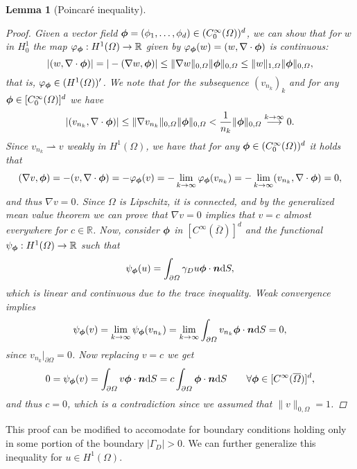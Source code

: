 \documentclass{article}
\renewcommand{\vec}{\vectorsym}
\newcommand{\R}{\mathbb{R}}
\newtheorem{lemma}{Lemma}
\begin{document}
\begin{lemma}[Poincaré inequality]
\begin{proof}
        Given a vector field $\vec\phi = (\phi_1,\dots,\phi_d)\in (C_0^\infty(\Omega))^d$, we can show that for $w$ in $H_0^1$ the map $\varphi_{\vec{\phi}}:H^1(\Omega)\to\R$ given by $\varphi_{\vec{\phi}}(w) = (w, \nabla\cdot \vec \phi)$ is continuous:
        $$|(w,\nabla\cdot\vec\phi)| = |-(\nabla w, \vec\phi)| \leq \|\nabla w\|_{0,\Omega}\|\vec\phi\|_{0,\Omega} \leq \|w\|_{1,\Omega}\|\vec\phi\|_{0,\Omega},$$
        that is, $\varphi_{\vec{\phi}} \in (H^1(\Omega))'$. We note that for the subsequence $(v_{n_k})_k$ and for any $\vec\phi \in [C_0^\infty(\Omega)]^d$ we have 
        $$|(v_{n_k},\nabla\cdot\vec\phi)| \leq \|\nabla v_{n_k}\|_{0,\Omega}\|\vec\phi\|_{0,\Omega} < \frac{1}{n_k}\|\vec\phi\|_{0,\Omega}\overset{k\to\infty}{\longrightarrow} 0. $$
        Since $v_{n_k} \rightharpoonup v$ weakly in $H^1(\Omega)$, we have that for any $\vec\phi \in (C_0^\infty(\Omega))^d$ it holds that
        \begin{align*}
            (\nabla v,\vec\phi) = -(v,\nabla\cdot\vec\phi) = -\varphi_{\vec{\phi}}(v) = -\lim_{k\to\infty} \varphi_{\vec{\phi}}(v_{n_k}) = -\lim_{k\to\infty} (v_{n_k},\nabla\cdot\vec\phi) = 0,
        \end{align*}
        and thus $\nabla v = 0$. Since $\Omega$ is Lipschitz, it is connected, and by the generalized mean value theorem we can prove that $\nabla v = 0$ implies that $v=c$ almost everywhere for $c\in \mathbb{R}$. Now, consider $\vec\phi$ in $[C^\infty(\overline{\Omega})]^d$ and the functional $\psi_{\vec{\phi}}:H^1(\Omega)\to \mathbb{R}$ such that 
        $$\psi_{\vec{\phi}}(u) = \int_{\partial\Omega} \gamma_D u \vec\phi\cdot\vec n \mathrm{d}S,$$
        which is linear and continuous due to the trace inequality. Weak convergence implies
        $$\psi_{\vec{\phi}}(v) = \lim_{k\to\infty} \psi_{\vec{\phi}}(v_{n_k}) = \lim_{k\to\infty} \int_{\partial\Omega} v_{n_k} \vec\phi\cdot\vec n \mathrm{d}S = 0,$$
        since  $v_{n_k}|_{\partial\Omega} = 0$. Now replacing $v=c$ we get
        $$0 = \psi_{\vec{\phi}}(v) = \int_{\partial\Omega} v\vec\phi \cdot\vec n\mathrm{d}S = c\int_{\partial\Omega} \vec\phi\cdot\vec n \mathrm{d}S \qquad \forall \vec\phi \in [C^\infty(\overline\Omega)]^d,$$
        and thus $c=0$, which is a contradiction since we assumed that $\|v\|_{0,\Omega}=1$. 
    \end{proof}
\end{lemma}

This proof can be modified to accomodate for boundary conditions holding only in some portion of the boundary $|\Gamma_D|>0$. We can further generalize this inequality for $u\in H^1(\Omega)$.
\end{document}
